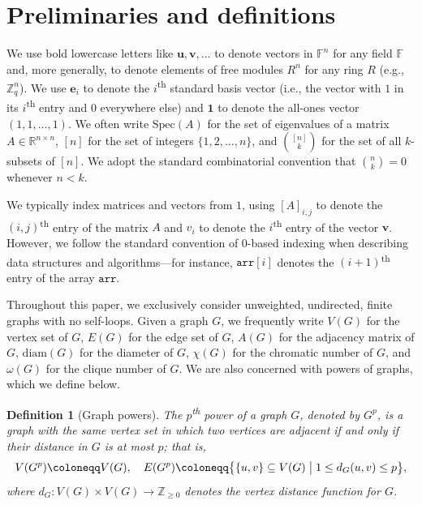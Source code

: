 \documentclass{article}
\def\Z{\mathbb{Z}}
\def\R{\mathbb{R}}
\def\F{\mathbb{F}}
\def\e{\mathbf{e}}
\def\u{\mathbf{u}}
\def\vv{\mathbf{v}} %
\def\1{\mathbf{1}}
\numberwithin{equation}{section}
\theoremstyle{plain}
\newtheorem{definition}{Definition}
\begin{document}
\section{Preliminaries and definitions}\label{section:2}

We use bold lowercase letters like $\u, \vv, \ldots$ to denote vectors in $\F^n$ for any field $\F$ and, more generally, to denote elements of free modules $R^n$ for any ring $R$ (e.g., $\Z_q^n$). We use $\e_i$ to denote the $i$\textsuperscript{th} standard basis vector (i.e., the vector with $1$ in its $i$\textsuperscript{th} entry and $0$ everywhere else) and $\1$ to denote the all-ones vector $(1, 1, \ldots, 1)$. We often write $\mathrm{Spec}(A)$ for the set of eigenvalues of a matrix $A \in \R^{n \times n}$, $[n]$ for the set of integers $\{1, 2, \ldots, n\}$, and $\binom{[n]}{k}$ for the set of all $k$-subsets of $[n]$. We adopt the standard combinatorial convention that $\binom{n}{k} = 0$ whenever $n < k$.

We typically index matrices and vectors from $1$, using $[A]_{i,j}$ to denote the $(i, j)$\textsuperscript{th} entry of the matrix $A$ and $v_i$ to denote the $i$\textsuperscript{th} entry of the vector $\vv$. However, we follow the standard convention of $0$-based indexing when describing data structures and algorithms---for instance, $\texttt{arr}[i]$ denotes the $(i + 1)$\textsuperscript{th} entry of the array $\texttt{arr}$.

Throughout this paper, we exclusively consider unweighted, undirected, finite graphs with no self-loops. Given a graph $G$, we frequently write $V(G)$ for the vertex set of $G$, $E(G)$ for the edge set of $G$, $A(G)$ for the adjacency matrix of $G$, $\mathrm{diam}(G)$ for the diameter of $G$, $\chi(G)$ for the chromatic number of $G$, and $\omega(G)$ for the clique number of $G$. We are also concerned with powers of graphs, which we define below.

\begin{definition}[Graph powers]\label{defn:1}
    The $p$\textsuperscript{th} \emph{power} of a graph $G$, denoted by $G^p$, is a graph with the same vertex set in which two vertices are adjacent if and only if their distance in $G$ is at most $p$; that is,
    \[V(G^p) \coloneqq V(G), \quad E(G^p) \coloneqq \bigl\{\{u, v\} \subseteq V(G) \bigm| 1 \le d_G(u, v) \le p\bigr\},\]
    where $d_G : V(G) \times V(G) \to \Z_{\ge 0}$ denotes the vertex distance function for $G$.
\end{definition}
\end{document}
